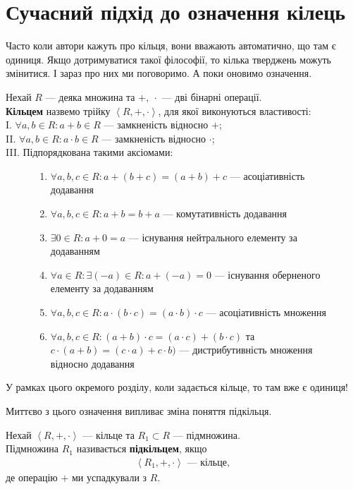 \documentclass{math_library}
\begin{document}
\section*{Сучасний підхід до означення кілець}
Часто коли автори кажуть про кільця, вони вважають автоматично, що там є одиниця. Якщо дотримуватися такої філософії, то кілька тверджень можуть змінитися. І зараз про них ми поговоримо. А поки оновимо означення.

\begin{definition*}
Нехай $R$ --- деяка множина та $+,\ \cdot$ --- дві бінарні операції.\\
\textbf{Кільцем} назвемо трійку $\left<R, +, \cdot \right>$, для якої виконуються властивості:\\
I. $\forall a,b \in R: a+b \in R$ --- замкненість відносно $+$;\\
II. $\forall a,b \in R: a \cdot b \in R$ --- замкненість відносно $\cdot$;\\
III. Підпорядкована такими аксіомами:
\begin{figure}[H]
\centering
\begin{enumerate}[wide = 0pt, nosep, label={\arabic*)}]
\item $\forall a,b,c \in R: a+(b+c) = (a+b)+c$ --- асоціативність додавання
\item $\forall a,b,c \in R: a+b = b+a$ --- комутативність додавання
\item $\exists 0 \in R: a+0 = a$ --- існування нейтрального елементу за додаванням
\item $\forall a \in R: \exists (-a) \in R: a+(-a) = 0$ --- існування оберненого елементу за додаванням
\item $\forall a,b,c \in R: a \cdot (b \cdot c) = (a \cdot b) \cdot c$ --- асоціативність множення
\item $\forall a,b,c \in R: (a+b)\cdot c = (a\cdot c) + (b \cdot c)$ та $c \cdot (a+b) = (c \cdot a) + c \cdot b)$ --- дистрибутивність множення відносно додавання
\color{red}{\item $\exists 1 \in R: a \cdot 1 = 1 \cdot a = a$ --- існування одиниці}
\end{enumerate}
\end{figure}
У рамках цього окремого розділу, коли задається кільце, то там вже є одиниця!
\end{definition*}

Миттєво з цього означення випливає зміна поняття підкільця.
\begin{definition*}
Нехай $\left<R,+, \cdot \right>$ --- кільце та $R_1 \subset R$ --- підмножина.\\
Підмножина $R_1$ називається \textbf{підкільцем}, якщо 
\begin{align*}
\left<R_1,+,\cdot \right> \text{ --- кільце},
\end{align*}
де операцію $+$ ми успадкували з $R$. 
\end{definition*}
\end{document}
